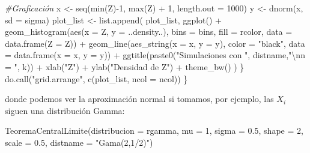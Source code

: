 \documentclass[
]{book}
\newenvironment{Shaded}{\begin{snugshade}}{\end{snugshade}}
\newcommand{\AttributeTok}[1]{\textcolor[rgb]{0.77,0.63,0.00}{#1}}
\newcommand{\CommentTok}[1]{\textcolor[rgb]{0.56,0.35,0.01}{\textit{#1}}}
\newcommand{\DecValTok}[1]{\textcolor[rgb]{0.00,0.00,0.81}{#1}}
\newcommand{\FloatTok}[1]{\textcolor[rgb]{0.00,0.00,0.81}{#1}}
\newcommand{\FunctionTok}[1]{\textcolor[rgb]{0.00,0.00,0.00}{#1}}
\newcommand{\NormalTok}[1]{#1}
\newcommand{\OtherTok}[1]{\textcolor[rgb]{0.56,0.35,0.01}{#1}}
\newcommand{\SpecialCharTok}[1]{\textcolor[rgb]{0.00,0.00,0.00}{#1}}
\newcommand{\StringTok}[1]{\textcolor[rgb]{0.31,0.60,0.02}{#1}}
\begin{document}
\begin{Shaded}
\begin{Highlighting}[]
    \CommentTok{\#Graficación}
\NormalTok{    x }\OtherTok{\textless{}{-}} \FunctionTok{seq}\NormalTok{(}\FunctionTok{min}\NormalTok{(Z)}\SpecialCharTok{{-}}\DecValTok{1}\NormalTok{, }\FunctionTok{max}\NormalTok{(Z) }\SpecialCharTok{+} \DecValTok{1}\NormalTok{, }\AttributeTok{length.out =} \DecValTok{1000}\NormalTok{)}
\NormalTok{    y }\OtherTok{\textless{}{-}} \FunctionTok{dnorm}\NormalTok{(x, }\AttributeTok{sd =}\NormalTok{ sigma)}
\NormalTok{    plot\_list }\OtherTok{\textless{}{-}} \FunctionTok{list.append}\NormalTok{(}
\NormalTok{      plot\_list, }
      \FunctionTok{ggplot}\NormalTok{() }\SpecialCharTok{+} 
      \FunctionTok{geom\_histogram}\NormalTok{(}\FunctionTok{aes}\NormalTok{(}\AttributeTok{x =}\NormalTok{ Z, }\AttributeTok{y =}\NormalTok{ ..density..), }\AttributeTok{bins =}\NormalTok{ bins, }\AttributeTok{fill =}\NormalTok{ rcolor, }
                     \AttributeTok{data =} \FunctionTok{data.frame}\NormalTok{(}\AttributeTok{Z =}\NormalTok{ Z)) }\SpecialCharTok{+}
      \FunctionTok{geom\_line}\NormalTok{(}\FunctionTok{aes\_string}\NormalTok{(}\AttributeTok{x =}\NormalTok{ x, }\AttributeTok{y =}\NormalTok{ y), }\AttributeTok{color =} \StringTok{"black"}\NormalTok{, }\AttributeTok{data =} \FunctionTok{data.frame}\NormalTok{(}\AttributeTok{x =}\NormalTok{ x, }\AttributeTok{y =}\NormalTok{ y)) }\SpecialCharTok{+}
      \FunctionTok{ggtitle}\NormalTok{(}\FunctionTok{paste0}\NormalTok{(}\StringTok{"Simulaciones con "}\NormalTok{, distname,}\StringTok{"}\SpecialCharTok{\textbackslash{}n}\StringTok{n = "}\NormalTok{, k)) }\SpecialCharTok{+}
      \FunctionTok{xlab}\NormalTok{(}\StringTok{"Z"}\NormalTok{) }\SpecialCharTok{+} \FunctionTok{ylab}\NormalTok{(}\StringTok{"Densidad de Z"}\NormalTok{) }\SpecialCharTok{+}
      \FunctionTok{theme\_bw}\NormalTok{()}
\NormalTok{    )}
\NormalTok{  \}}
  \FunctionTok{do.call}\NormalTok{(}\StringTok{"grid.arrange"}\NormalTok{, }\FunctionTok{c}\NormalTok{(plot\_list, }\AttributeTok{ncol =}\NormalTok{ ncol))}
\NormalTok{\}}
\end{Highlighting}
\end{Shaded}

donde podemos ver la aproximación normal si tomamos, por ejemplo, las \(X_i\) siguen una distribución Gamma:

\begin{Shaded}
\begin{Highlighting}[]
\FunctionTok{TeoremaCentralLimite}\NormalTok{(}\AttributeTok{distribucion =}\NormalTok{ rgamma, }\AttributeTok{mu =} \DecValTok{1}\NormalTok{, }\AttributeTok{sigma =} \FloatTok{0.5}\NormalTok{, }\AttributeTok{shape =} \DecValTok{2}\NormalTok{, }
                     \AttributeTok{scale =} \FloatTok{0.5}\NormalTok{, }\AttributeTok{distname =} \StringTok{"Gama(2,1/2)"}\NormalTok{)}
\end{Highlighting}
\end{Shaded}
\end{document}
